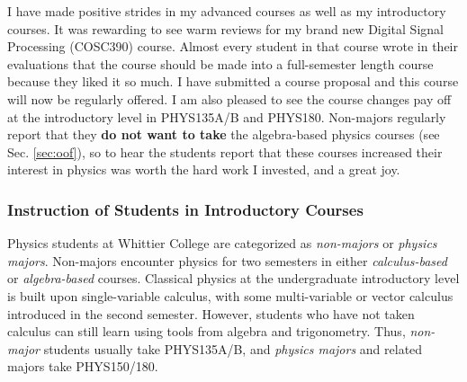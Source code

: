 \documentclass[../../main.tex]{subfiles}
\begin{document}
I have made positive strides in my advanced courses as well as my introductory courses.  It was rewarding to see warm reviews for my brand new Digital Signal Processing (COSC390) course.  Almost every student in that course wrote in their evaluations that the course should be made into a full-semester length course because they liked it so much.  I have submitted a course proposal and this course will now be regularly offered.  I am also pleased to see the course changes pay off at the introductory level in PHYS135A/B and PHYS180.  Non-majors regularly report that they \textbf{do not want to take} the algebra-based physics courses (see Sec. \ref{sec:oof}), so to hear the students report that these courses increased their interest in physics was worth the hard work I invested, and a great joy.

\subsubsection{Instruction of Students in Introductory Courses}

\label{sec:teaching_phil1}

Physics students at Whittier College are categorized as \textit{non-majors} or \textit{physics majors}.  Non-majors encounter physics for two semesters in either \textit{calculus-based} or \textit{algebra-based} courses.  Classical physics at the undergraduate introductory level is built upon single-variable calculus, with some multi-variable or vector calculus introduced in the second semester.  However, students who have not taken calculus can still learn using tools from algebra and trigonometry.  Thus, \textit{non-major} students usually take PHYS135A/B, and \textit{physics majors} and related majors take PHYS150/180.  \\ \hspace{0.1cm}
\end{document}
